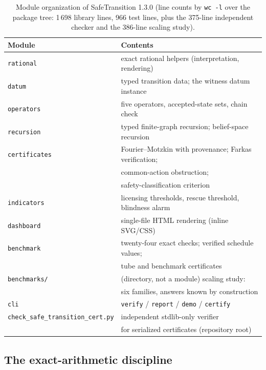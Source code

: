 \documentclass[11pt]{article}
\begin{document}
\begin{table}[t]
\centering
\small
\begin{tabular}{@{}ll@{}}
\toprule
Module & Contents \\
\midrule
\texttt{rational} & exact rational helpers (interpretation, rendering) \\
\texttt{datum} & typed transition data; the witness datum instance \\
\texttt{operators} & five operators, accepted-state sets, chain check \\
\texttt{recursion} & typed finite-graph recursion; belief-space recursion \\
\texttt{certificates} & Fourier--Motzkin with provenance; Farkas verification; \\
                       & common-action obstruction; \\
                       & safety-classification criterion \\
\texttt{indicators} & licensing thresholds, rescue threshold, blindness alarm \\
\texttt{dashboard} & single-file HTML rendering (inline SVG/CSS) \\
\texttt{benchmark} & twenty-four exact checks; verified schedule values; \\
                       & tube and benchmark certificates \\
\texttt{benchmarks/} & (directory, not a module) scaling study: \\
                       & six families, answers known by construction \\
\texttt{cli} & \texttt{verify} / \texttt{report} / \texttt{demo} / \texttt{certify} \\
\texttt{check\_safe\_transition\_cert.py} & independent stdlib-only verifier \\
                       & for serialized certificates (repository root) \\
\bottomrule
\end{tabular}
\caption{Module organization of SafeTransition 1.3.0 (line counts by
\texttt{wc~-l} over the package tree: 1\,698 library lines, 966 test
lines, plus the 375-line independent checker and the 386-line scaling
study).}
\label{tab:modules}
\end{table}

\subsection{The exact-arithmetic discipline}\label{sec:exactness}
\end{document}
